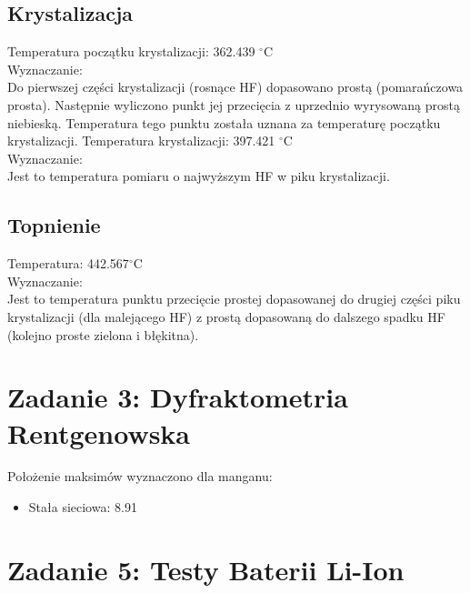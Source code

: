 \documentclass[a4paper,10pt]{article}
\begin{document}
\subsection{Krystalizacja}
Temperatura początku krystalizacji: 362.439 $^\circ$C \\
Wyznaczanie: \\
Do pierwszej części krystalizacji (rosnące HF) dopasowano prostą (pomarańczowa prosta). Następnie wyliczono punkt jej przecięcia z uprzednio wyrysowaną prostą niebieską. Temperatura tego punktu została uznana za temperaturę początku krystalizacji.
Temperatura krystalizacji: 397.421 $^\circ$C \\
Wyznaczanie: \\
Jest to temperatura pomiaru o najwyższym HF w piku krystalizacji.

\subsection{Topnienie}
Temperatura: 442.567$^\circ$C \\
Wyznaczanie: \\
Jest to temperatura punktu przecięcie prostej dopasowanej do drugiej części piku krystalizacji (dla malejącego HF) z prostą dopasowaną do dalszego spadku HF (kolejno proste zielona i błękitna).
 
\section{Zadanie 3: Dyfraktometria Rentgenowska}
Położenie maksimów wyznaczono dla manganu: \\
\begin{itemize}
	\item Stała sieciowa: 8.91 %
\end{itemize}

\section{Zadanie 5: Testy Baterii Li-Ion}

 
\end{document}
